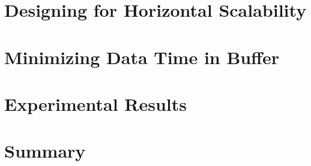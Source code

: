 \section{Designing for Horizontal Scalability}
\section{Minimizing Data Time in Buffer}
\section{Experimental Results}
\section{Summary}







% 
% 
% 
% 
% 
% 





